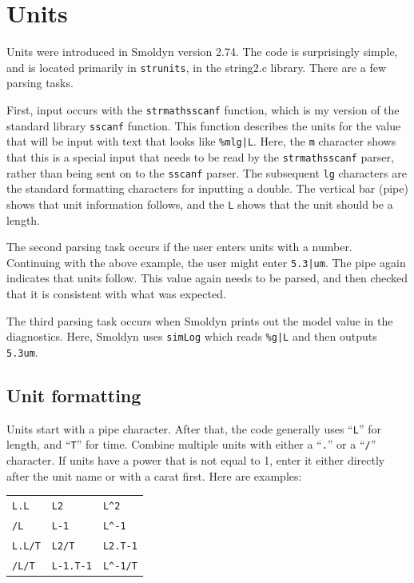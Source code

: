 \documentclass {scrbook}
\newcommand {\ttt} {\texttt}
\begin{document}
\section{Units}

Units were introduced in Smoldyn version 2.74. The code is surprisingly simple, and is located primarily in \ttt{strunits}, in the string2.c library. There are a few parsing tasks.

First, input occurs with the \ttt{strmathsscanf} function, which is my version of the standard library \ttt{sscanf} function. This function describes the units for the value that will be input with text that looks like \ttt{\%mlg|L}. Here, the \ttt{m} character shows that this is a special input that needs to be read by the \ttt{strmathsscanf} parser, rather than being sent on to the \ttt{sscanf} parser. The subsequent \ttt{lg} characters are the standard formatting characters for inputting a double. The vertical bar (pipe) shows that unit information follows, and the \ttt{L} shows that the unit should be a length.

The second parsing task occurs if the user enters units with a number. Continuing with the above example, the user might enter \ttt{5.3|um}. The pipe again indicates that units follow. This value again needs to be parsed, and then checked that it is consistent with what was expected.

The third parsing task occurs when Smoldyn prints out the model value in the diagnostics. Here, Smoldyn uses \ttt{simLog} which reads \ttt{\%g|L} and then outputs \ttt{5.3um}.

\subsection{Unit formatting}

Units start with a pipe character. After that, the code generally uses ``\ttt{L}'' for length, and ``\ttt{T}'' for time. Combine multiple units with either a ``\ttt{.}'' or a ``\ttt{/}'' character. If units have a power that is not equal to 1, enter it either directly after the unit name or with a carat first. Here are examples:

\begin{longtable}[c]{lll}
\ttt{L.L} & \ttt{L2} & \ttt{L\^{}2}\\
\ttt{/L} & \ttt{L-1} & \ttt{L\^{}-1}\\
\ttt{L.L/T} & \ttt{L2/T} & \ttt{L2.T-1}\\
\ttt{/L/T} & \ttt{L-1.T-1} & \ttt{L\^{}-1/T}
\end{longtable}
\end{document}
